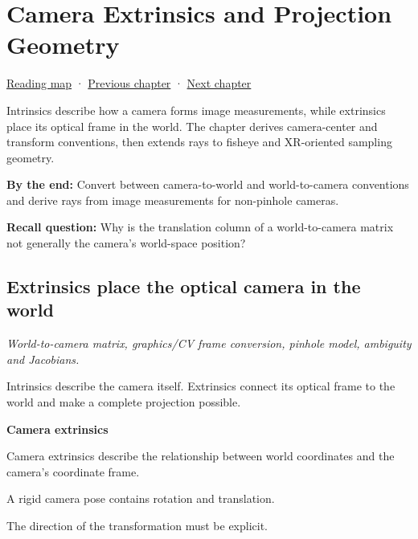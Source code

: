 \chapter{Camera Extrinsics and Projection Geometry}\label{02-foundations-ii-ch035-camera-extrinsics-and-projection-geometry}\hypertarget{02-foundations-ii-ch035}{}\label{stagechapter:02-foundations-ii-ch035}

\hypertarget{02-foundations-ii-ch035-camera-extrinsics-and-projection-geometry}{}

\hyperref[volume-reading-map]{Reading map} · \hyperref[02-foundations-ii-ch034-robust-predicates-and-camera-sensitivity]{Previous chapter} · \hyperref[02-foundations-ii-ch036-exposure-physical-optics-and-depth-of-field]{Next chapter}

Intrinsics describe how a camera forms image measurements, while extrinsics place its optical frame in the world. The chapter derives camera-center and transform conventions, then extends rays to fisheye and XR-oriented sampling geometry.

\textbf{By the end:} Convert between camera-to-world and world-to-camera conventions and derive rays from image measurements for non-pinhole cameras.

\textbf{Recall question:} Why is the translation column of a world-to-camera matrix not generally the camera's world-space position?

\section{Extrinsics place the optical camera in the world}\label{02-foundations-ii-ch035-extrinsics-place-the-optical-camera-in-the-world}

\hypertarget{02-foundations-ii-ch035-extrinsics-place-the-optical-camera-in-the-world}{}

\emph{World-to-camera matrix, graphics/CV frame conversion, pinhole model, ambiguity and Jacobians.}

Intrinsics describe the camera itself. Extrinsics connect its optical frame to the world and make a complete projection possible.

\textbf{Camera extrinsics}

Camera extrinsics describe the relationship between world coordinates and the camera's coordinate frame.

A rigid camera pose contains rotation and translation.

The direction of the transformation must be explicit.

